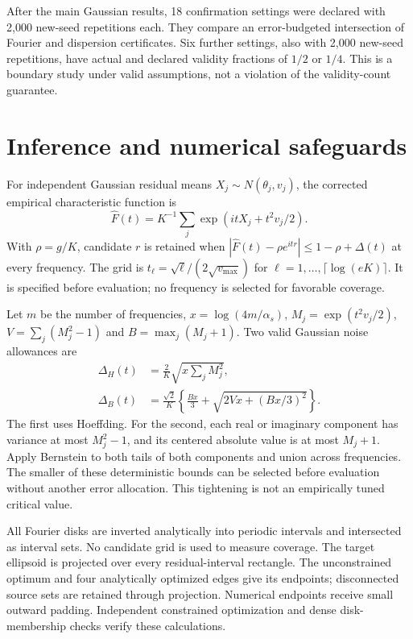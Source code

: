\documentclass[11pt]{article}
\begin{document}
After the main Gaussian results, 18 confirmation settings were declared with
2,000 new-seed repetitions each. They compare an error-budgeted intersection
of Fourier and dispersion certificates. Six further settings, also with
2,000 new-seed repetitions, have actual and declared validity fractions of
$1/2$ or $1/4$. This is a boundary study under valid assumptions, not a
violation of the validity-count guarantee.

\section{Inference and numerical safeguards}

For independent Gaussian residual means $X_j\sim N(\theta_j,v_j)$,
the corrected empirical characteristic function is
\[
 \widehat F(t)=K^{-1}\sum_j\exp(itX_j+t^2v_j/2).
\]
With $\rho=g/K$, candidate $r$ is retained when
$|\widehat F(t)-\rho e^{itr}|\le1-\rho+\Delta(t)$ at every frequency.
The grid is $t_\ell=\sqrt\ell/(2\sqrt{v_{\max}})$ for
$\ell=1,\ldots,\lceil\log(eK)\rceil$. It is specified before evaluation;
no frequency is selected for favorable coverage.

Let $m$ be the number of frequencies, $x=\log(4m/\alpha_s)$,
$M_j=\exp(t^2v_j/2)$, $V=\sum_j(M_j^2-1)$ and $B=\max_j(M_j+1)$.
Two valid Gaussian noise allowances are
\begin{align*}
 \Delta_H(t)&=\frac2K\sqrt{x\sum_jM_j^2},\\
 \Delta_B(t)&=\frac{\sqrt2}{K}
 \left\{\frac{Bx}{3}+\sqrt{2Vx+(Bx/3)^2}\right\}.
\end{align*}
The first uses Hoeffding. For the second, each real or imaginary component
has variance at most $M_j^2-1$, and its centered absolute value is at most
$M_j+1$. Apply Bernstein to both tails of both components and union across
frequencies. The smaller of these deterministic bounds can be selected before
evaluation without another error allocation. This tightening is not an
empirically tuned critical value.

All Fourier disks are inverted analytically into periodic intervals and
intersected as interval sets. No candidate grid is used to measure coverage.
The target ellipsoid is projected over every residual-interval rectangle.
The unconstrained optimum and four analytically optimized edges give its
endpoints; disconnected source sets are retained through projection.
Numerical endpoints receive small outward padding. Independent constrained
optimization and dense disk-membership checks verify these calculations.
\end{document}
